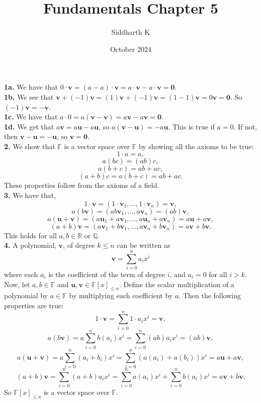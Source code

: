 \documentclass{article}
\title{Fundamentals Chapter 5}
\author{Siddharth K}
\date{October 2024}
\newcommand{\bv}{\mathbf{v}}
\newcommand{\bu}{\mathbf{u}}
\newcommand{\bO}{\mathbf{0}}
\newcommand{\R}{\mathbb{R}}
\newcommand{\Q}{\mathbb{Q}}
\newcommand{\F}{\mathbb{F}}
\begin{document}
\maketitle

\textbf{1a.} We have that $0\cdot \bv = (a - a)\cdot \bv = a\cdot \bv - a\cdot \bv = \bO$. \\

\textbf{1b.} We see that $\bv + (-1)\bv = (1)\bv + (-1)\bv = (1 - 1)\bv = 0\bv = \bO$. So $(-1)\bv = -\bv$. \\

\textbf{1c.} We have that $a\cdot 0 = a(\bv - \bv) = a\bv - a\bv = \bO$. \\

\textbf{1d.} We get that $a\bv = a\bu - a\bu$, so $a(\bv - \bu) = -a\bu$. This is true if $a = 0$. If not, then $\bv - \bu = -\bu$, so $\bv = \bO$. \\

\textbf{2.} We show that $\F$ is a vector space over $\F$ by showing all the axioms to be true:
$$1\cdot a = a,$$
$$a(bc) = (ab)c,$$
$$a(b + c) = ab + ac,$$
$$(a + b)c = a(b + c) = ab + ac.$$
These properties follow from the axioms of a field. \\

\textbf{3.} We have that,
$$1\cdot \bv = (1\cdot \bv_1, \ldots, 1\cdot \bv_n) = \bv,$$
$$a(b\bv) = (ab\bv_1, \ldots, a\bv_n) = (ab)\bv,$$
$$a(\bu + \bv) = (a\bu_1 + a\bv_1, \ldots, a\bu_n + a\bv_n) = a\bu + a\bv,$$
$$(a + b)\bv = (a\bv_1 + b\bv_1, \ldots, a\bv_n + b\bv_n) = a\bv + b\bv.$$
This holds for all $a, b \in \R$ or $\Q$. \\

\textbf{4.} A polynomial, $\bv$, of degree $k \le n$ can be written as
$$\bv = \sum_{i=0}^n a_ix^i$$
where each $a_i$ is the coefficient of the term of degree $i$, and $a_i = 0$ for all $i > k$. \\

Now, let $a, b \in \F$ and $\bu, \bv \in \F[x]_{\le n}$. Define the scalar multiplication of a polynomial by $a \in \F$ by multiplying each coefficient by $a$. Then the following properties are true:
$$1 \cdot \bv = \sum_{i=0}^n 1\cdot a_ix^i = \bv,$$
$$a(b\bv) = a\sum_{i=0}^n b(a_i)x^i = \sum_{i=0}^n (ab)a_ix^i = (ab)\bv,$$
$$a(\bu + \bv) = a\sum_{i=0}^n (a_i + b_i)x^i = \sum_{i=0}^n (a(a_i) + a(b_i))x^i = a\bu + a\bv,$$
$$(a + b)\bv = \sum_{i=0}^n (a + b)a_ix^i = \sum_{i=0}^n a(a_i)x^i + \sum_{i=0}^n b(a_i)x^i = a\bv + b\bv.$$
So $\F[x]_{\le n}$ is a vector space over $\F$. \\
\end{document}

